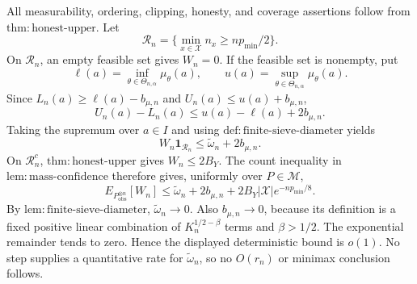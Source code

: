 All measurability, ordering, clipping, honesty, and coverage assertions follow from \(\mathrm{thm{:}honest\text{-}upper}\). Let
\[
 \mathcal R_n=\{\min_{x\in\mathcal X}n_x\ge np_{\min}/2\}.
\]
On \(\mathcal R_n\), an empty feasible set gives \(W_n=0\). If the feasible set is nonempty, put
\[
 \ell(a)=\inf_{\theta\in\Theta_{n,\alpha}}\mu_\theta(a),
 \qquad
 u(a)=\sup_{\theta\in\Theta_{n,\alpha}}\mu_\theta(a).
\]
Since \(L_n(a)\ge\ell(a)-b_{\mu,n}\) and \(U_n(a)\le u(a)+b_{\mu,n}\),
\[
 U_n(a)-L_n(a)\le u(a)-\ell(a)+2b_{\mu,n}.
\]
Taking the supremum over \(a\in I\) and using \(\mathrm{def{:}finite\text{-}sieve\text{-}diameter}\) yields
\[
 W_n\mathbf1_{\mathcal R_n}
 \le\widetilde\omega_n+2b_{\mu,n}.
\]
On \(\mathcal R_n^c\), \(\mathrm{thm{:}honest\text{-}upper}\) gives \(W_n\le2B_Y\). The count inequality in \(\mathrm{lem{:}mass\text{-}confidence}\) therefore gives, uniformly over \(P\in\mathcal M\),
\[
 E_{P_{\mathrm{obs}}^{\otimes n}}[W_n]
 \le\widetilde\omega_n+2b_{\mu,n}
   +2B_Y|\mathcal X|e^{-np_{\min}/8}.
\]
By \(\mathrm{lem{:}finite\text{-}sieve\text{-}diameter}\), \(\widetilde\omega_n\to0\). Also \(b_{\mu,n}\to0\), because its definition is a fixed positive linear combination of \(K_n^{1/2-\beta}\) terms and \(\beta>1/2\). The exponential remainder tends to zero. Hence the displayed deterministic bound is \(o(1)\). No step supplies a quantitative rate for \(\widetilde\omega_n\), so no \(O(r_n)\) or minimax conclusion follows.
